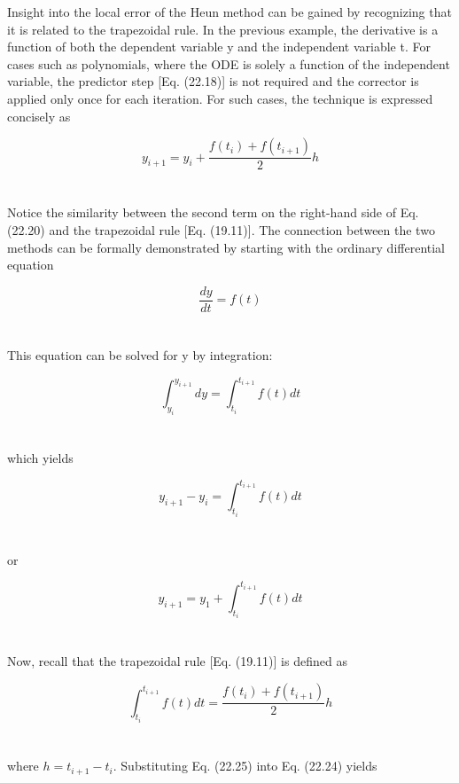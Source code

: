 Insight into the local error of the Heun method can be gained by recognizing that it is
related to the trapezoidal rule. In the previous example, the derivative is a function of both
the dependent variable y and the independent variable t. For cases such as polynomials,
where the ODE is solely a function of the independent variable, the predictor step
[Eq. (22.18)] is not required and the corrector is applied only once for each iteration. For
such cases, the technique is expressed concisely as

\begin{equation}
\tag{22.20}
y_{i+1} = y_{i} + \dfrac{f(t_{i}) + f(t_{i+1})}{2}h
\end{equation}\\
\\
Notice the similarity between the second term on the right-hand side of Eq. (22.20) and the
trapezoidal rule [Eq. (19.11)]. The connection between the two methods can be formally
demonstrated by starting with the ordinary differential equation

\begin{equation}
\tag{22.21}
\dfrac{dy}{dt} = f(t)
\end{equation}\\
\\
This equation can be solved for y by integration:

\begin{equation}
\tag{22.22}
\int^{y_{i+1}}_{y_{i}} dy = \int^{t_{i+1}}_{t_{i}} f(t)dt
\end{equation}\\
\\
which yields

\begin{equation}
\tag{22.23}
y_{i+1} - y_{i} = \int^{t_{i+1}}_{t_{i}} f(t)dt
\end{equation}\\
\\
or

\begin{equation}
\tag{22.24}
y_{i+1} = y_{1} + \int^{t_{i+1}}_{t_{i}} f(t)dt
\end{equation}\\
\\
Now, recall that the trapezoidal rule [Eq. (19.11)] is defined as


\begin{equation}
\tag{22.25}
\int^{t_{i+1}}_{t_{i}} f(t)dt = \dfrac{f(t_{i})+ f(t_{i+1})}{2}h
\end{equation}\\
\\
where $h = t_{i+1} - t_{i}$. Substituting Eq. (22.25) into Eq. (22.24) yields

